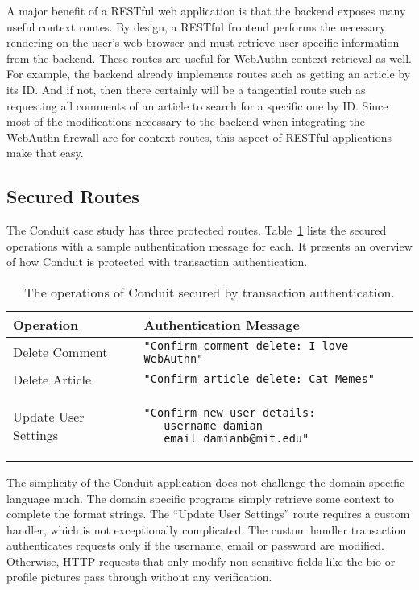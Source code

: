 A major benefit of a RESTful web application is that the backend exposes many useful context routes. By design, a RESTful frontend performs the necessary rendering on the user's web-browser and must retrieve user specific information from the backend. These routes are useful for WebAuthn context retrieval as well. For example, the backend already implements routes such as getting an article by its ID. And if not, then there certainly will be a tangential route such as requesting all comments of an article to search for a specific one by ID. Since most of the modifications necessary to the backend when integrating the WebAuthn firewall are for context routes, this aspect of RESTful applications make that easy.

\subsection{Secured Routes}

The Conduit case study has three protected routes. Table~\ref{Table:ConduitSecuredRoutes} lists the secured operations with a sample authentication message for each. It presents an overview of how Conduit is protected with transaction authentication.

\begin{table}[h]
\centering

\begin{tabular}{ m{5cm} m{9cm}  } 
 \hline
 Operation & Authentication Message \\ 
 \hline \hline

 Delete Comment & \lstinline|"Confirm comment delete: I love WebAuthn"| \\ \hline

 Delete Article & \lstinline|"Confirm article delete: Cat Memes"| \\ \hline

 Update User Settings & 
 \begin{lstlisting} 
"Confirm new user details:
   username damian
   email damianb@mit.edu"
\end{lstlisting} 
\\ \hline

\end{tabular}
\caption{The operations of Conduit secured by transaction authentication.}
\label{Table:ConduitSecuredRoutes}
\end{table}

The simplicity of the Conduit application does not challenge the domain specific language much. The domain specific programs simply retrieve some context to complete the format strings. The ``Update User Settings'' route requires a custom handler, which is not exceptionally complicated. The custom handler transaction authenticates requests only if the username, email or password are modified. Otherwise, HTTP requests that only modify non-sensitive fields like the bio or profile pictures pass through without any verification.

